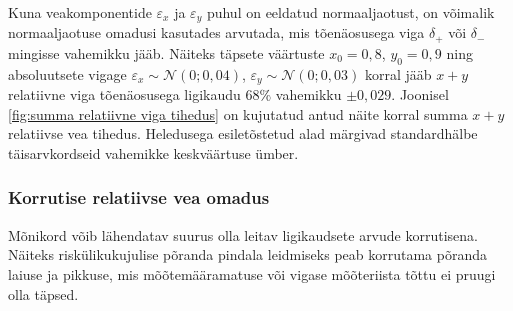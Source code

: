 Kuna veakomponentide $\varepsilon_x$ ja $\varepsilon_y$ puhul on eeldatud normaaljaotust, on võimalik normaaljaotuse omadusi kasutades arvutada, mis tõenäosusega viga $\delta_{+}$ või $\delta_{-}$ mingisse vahemikku jääb.
Näiteks täpsete väärtuste $x_0=0{,}8$, $y_0=0{,}9$ ning absoluutsete vigage $\varepsilon_x\sim\mathcal{N}(0; 0{,}04)$, $\varepsilon_y\sim\mathcal{N}(0; 0{,}03)$ korral jääb $x+y$ relatiivne viga tõenäosusega ligikaudu $68\%$ vahemikku $\pm0{,}029$.
Joonisel \ref{fig:summa relatiivne viga tihedus} on kujutatud antud näite korral summa $x+y$ relatiivse vea tihedus. Heledusega esiletõstetud alad märgivad standardhälbe täisarvkordseid vahemikke keskväärtuse ümber.

\subsubsection{Korrutise relatiivse vea omadus}
Mõnikord võib lähendatav suurus olla leitav ligikaudsete arvude korrutisena. Näiteks riskülikukujulise põranda pindala leidmiseks peab korrutama põranda laiuse ja pikkuse, mis mõõtemääramatuse või vigase mõõteriista tõttu ei pruugi olla täpsed.

